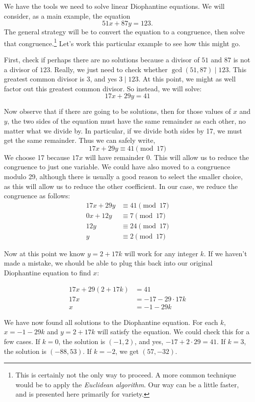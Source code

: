 \documentclass[12pt]{article}
\begin{document}
We have the tools we need to solve linear Diophantine equations.  We will consider, as a main example, the equation
\[51x + 87y = 123.\]
The general strategy will be to convert the equation to a congruence, then solve that congruence.\footnote{This is certainly not the only way to proceed.  A more common technique would be to apply the {\em Euclidean algorithm}.  Our way can be a little faster, and is presented here primarily for variety.} Let's work this particular example to see how this might go.

First, check if perhaps there are no solutions because a divisor of $51$ and $87$ is not a divisor of $123$.  Really, we just need to check whether $\gcd(51, 87) \mid 123$.  This greatest common divisor is 3, and yes $3 \mid 123$.  At this point, we might as well factor out this greatest common divisor.  So instead, we will solve:
\[17x + 29y = 41\]

Now observe that if there are going to be solutions, then for those values of $x$ and $y$, the two sides of the equation must have the same remainder as each other, no matter what we divide by.  In particular, if we divide both sides by 17, we must get the same remainder. Thus we can safely write,
\[17x + 29y \equiv 41 \pmod{17}\]
We choose 17 because $17x$ will have remainder 0.  This will allow us to reduce the congruence to just one variable.  We could have also moved to a congruence modulo 29, although there is usually a good reason to select the smaller choice, as this will allow us to reduce the other coefficient.  In our case, we reduce the congruence as follows:
\[ \begin{aligned}
17x + 29y & \equiv 41 \pmod{17} \\
0x + 12y & \equiv 7 \pmod{17} \\
12 y & \equiv 24 \pmod{17} \\
y & \equiv 2 \pmod{17}
\end{aligned}\]

Now at this point we know $y = 2 + 17k$ will work for any integer $k$.  If we haven't made a mistake, we should be able to plug this back into our original Diophantine equation to find $x$:

\[\begin{aligned}
17x + 29(2 + 17k) & = 41\\
17x & = -17 - 29\cdot 17k\\
x & = -1-29k
\end{aligned}\]

We have now found all solutions to the Diophantine equation.  For each $k$, $x = -1-29k$ and $y = 2 + 17k$ will satisfy the equation.  We could check this for a few cases.  If $k = 0$, the solution is $(-1,2)$, and yes, $-17 + 2\cdot 29 = 41$.  If $k = 3$, the solution is $(-88, 53)$.  If $k = -2$, we get $(57, -32)$.
\end{document}
